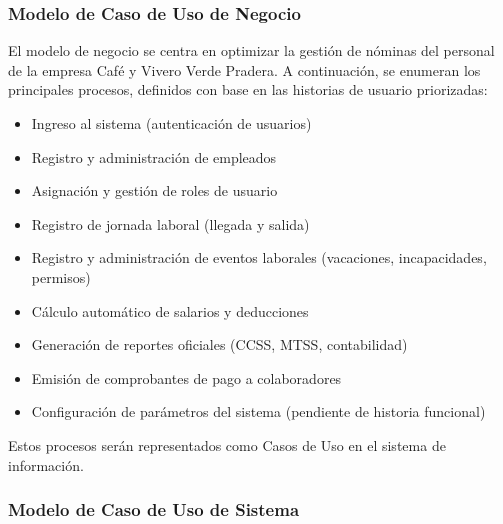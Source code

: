 \subsubsection*{Modelo de Caso de Uso de Negocio}

El modelo de negocio se centra en optimizar la gestión de nóminas del personal de la empresa Café y Vivero Verde Pradera. A continuación, se enumeran los principales procesos, definidos con base en las historias de usuario priorizadas:

\begin{itemize}
	\item Ingreso al sistema (autenticación de usuarios)
	\item Registro y administración de empleados
	\item Asignación y gestión de roles de usuario
	\item Registro de jornada laboral (llegada y salida)
	\item Registro y administración de eventos laborales (vacaciones, incapacidades, permisos)
	\item Cálculo automático de salarios y deducciones
	\item Generación de reportes oficiales (CCSS, MTSS, contabilidad)
	\item Emisión de comprobantes de pago a colaboradores
	\item Configuración de parámetros del sistema (pendiente de historia funcional)
\end{itemize}

Estos procesos serán representados como Casos de Uso en el sistema de información.

\subsubsection*{Modelo de Caso de Uso de Sistema}

